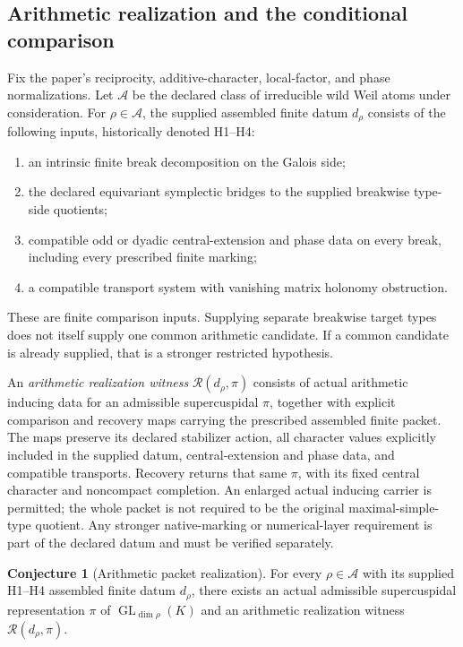\documentclass[11pt]{amsart}
\theoremstyle{definition}
\newtheorem{conjecture}[conjecture]{Conjecture}
\theoremstyle{remark}
\newcommand{\GL}{\operatorname{GL}}
\begin{document}
\subsection{Arithmetic realization and the conditional comparison}

Fix the paper's reciprocity, additive-character, local-factor, and phase
normalizations. Let \(\mathcal A\) be the declared class of irreducible wild
Weil atoms under consideration. For \(\rho\in\mathcal A\), the supplied
assembled finite datum \(d_\rho\) consists of the following inputs,
historically denoted H1--H4:
\begin{enumerate}
\item an intrinsic finite break decomposition on the Galois side;
\item the declared equivariant symplectic bridges to the supplied breakwise
type-side quotients;
\item compatible odd or dyadic central-extension and phase data on every
break, including every prescribed finite marking;
\item a compatible transport system with vanishing matrix holonomy
obstruction.
\end{enumerate}
These are finite comparison inputs. Supplying separate breakwise target
types does not itself supply one common arithmetic candidate. If a common
candidate is already supplied, that is a stronger restricted hypothesis.

An \emph{arithmetic realization witness}
\(\mathcal R(d_\rho,\pi)\) consists of actual arithmetic inducing data
for an admissible supercuspidal \(\pi\), together with explicit
comparison and recovery maps carrying the prescribed assembled finite
packet. The maps preserve its declared stabilizer action, all character values
explicitly included in the supplied datum, central-extension and phase
data, and compatible transports.
Recovery returns that same \(\pi\), with its fixed central character and
noncompact completion. An enlarged actual inducing carrier is permitted;
the whole packet is not required to be the original maximal-simple-type
quotient. Any stronger native-marking or numerical-layer requirement is
part of the declared datum and must be verified separately.

\begingroup
\renewcommand{\theconjecture}{66}
\begin{conjecture}[Arithmetic packet realization]
\label{conj:arithmetic_realization}\label{thm:conditional_atomic}
For every \(\rho\in\mathcal A\) with its supplied H1--H4 assembled
finite datum \(d_\rho\), there exists an actual admissible supercuspidal
representation \(\pi\) of \(\GL_{\dim\rho}(K)\) and an arithmetic
realization witness \(\mathcal R(d_\rho,\pi)\).
\end{conjecture}
\endgroup
\end{document}
